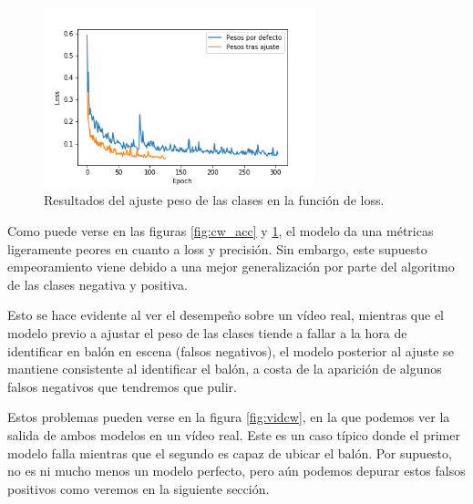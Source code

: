 \begin{figure}[H]
  \centering
  \includegraphics[width=0.7\textwidth]{images/cw_loss}
  \caption{Resultados del ajuste peso de las clases en la función de loss.}
  \label{fig:cw_loss}
\end{figure}

Como puede verse en las figuras \ref{fig:cw_acc} y \ref{fig:cw_loss}, el modelo da una métricas ligeramente peores en cuanto a loss y precisión. Sin embargo, este supuesto empeoramiento viene debido a una mejor generalización por parte del algoritmo de las clases negativa y positiva.

Esto se hace evidente al ver el desempeño sobre un vídeo real, mientras que el modelo previo a ajustar el peso de las clases tiende a fallar a la hora de identificar en balón en escena (falsos negativos), el modelo posterior al ajuste se mantiene consistente al identificar el balón, a costa de la aparición de algunos falsos negativos que tendremos que pulir.

Estos problemas pueden verse en la figura \ref{fig:vidcw}, en la que podemos ver la salida de ambos modelos en un vídeo real. Este es un caso típico donde el primer modelo falla mientras que el segundo es capaz de ubicar el balón. Por supuesto, no es ni mucho menos un modelo perfecto, pero aún podemos depurar estos falsos positivos como veremos en la siguiente sección.

